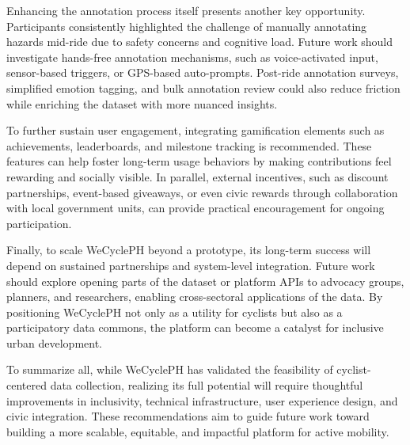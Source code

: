 Enhancing the annotation process itself presents another key opportunity. Participants consistently highlighted the challenge of manually annotating hazards mid-ride due to safety concerns and cognitive load. Future work should investigate hands-free annotation mechanisms, such as voice-activated input, sensor-based triggers, or GPS-based auto-prompts. Post-ride annotation surveys, simplified emotion tagging, and bulk annotation review could also reduce friction while enriching the dataset with more nuanced insights.

To further sustain user engagement, integrating gamification elements such as achievements, leaderboards, and milestone tracking is recommended. These features can help foster long-term usage behaviors by making contributions feel rewarding and socially visible. In parallel, external incentives, such as discount partnerships, event-based giveaways, or even civic rewards through collaboration with local government units, can provide practical encouragement for ongoing participation.

Finally, to scale WeCyclePH beyond a prototype, its long-term success will depend on sustained partnerships and system-level integration. Future work should explore opening parts of the dataset or platform APIs to advocacy groups, planners, and researchers, enabling cross-sectoral applications of the data. By positioning WeCyclePH not only as a utility for cyclists but also as a participatory data commons, the platform can become a catalyst for inclusive urban development.

To summarize all, while WeCyclePH has validated the feasibility of cyclist-centered data collection, realizing its full potential will require thoughtful improvements in inclusivity, technical infrastructure, user experience design, and civic integration. These recommendations aim to guide future work toward building a more scalable, equitable, and impactful platform for active mobility.



